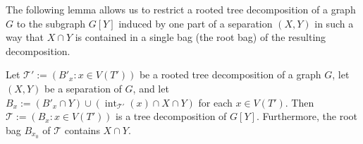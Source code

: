 \documentclass{patmorin}
\DeclareMathOperator{\interior}{int}
\DeclareMathOperator{\boundary}{\partial}
\begin{document}


The following lemma allows us to restrict a rooted tree decomposition of a graph $G$ to the subgraph $G[Y]$ induced by one part of a separation $(X,Y)$ in such a way that $X\cap Y$ is contained in a single bag (the root bag) of the resulting decomposition.

\begin{lem}\label{restricted_decomp}
    Let $\mathcal{T}':=(B'_x:x\in V(T'))$ be a rooted tree decomposition of a graph $G$, let $(X,Y)$ be a separation of $G$, and let $B_x:=(B'_x\cap Y)\cup (\interior_{\mathcal{T}'}(x) \cap X \cap Y)$ for each $x\in V(T')$.  Then $\mathcal{T}:=(B_x:x\in V(T'))$ is a tree decomposition of $G[Y]$.  Furthermore, the root bag $B_{x_0}$ of $\mathcal{T}$ contains $X\cap Y$.
\end{lem}
\end{document}
